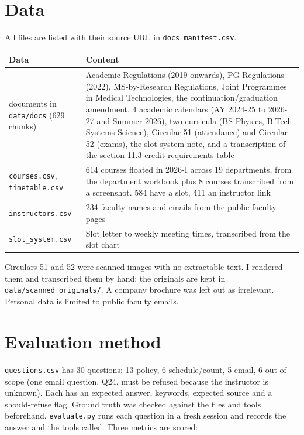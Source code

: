 \documentclass[10pt,a4paper]{article}
\newcommand{\code}[1]{\texttt{\small #1}}
\begin{document}
\section{Data}

All files are listed with their source URL in \code{docs\_manifest.csv}.

\begin{center}\small
\begin{tabularx}{\linewidth}{@{}>{\raggedright\arraybackslash}p{3.6cm}X@{}}
\toprule
Data & Content\\
\midrule
15 documents in \code{data/docs} (629 chunks) & Academic Regulations (2019 onwards), PG Regulations (2022), MS-by-Research Regulations, Joint Programmes in Medical Technologies, the continuation/graduation amendment, 4 academic calendars (AY 2024-25 to 2026-27 and Summer 2026), two curricula (BS Physics, B.Tech Systems Science), Circular 51 (attendance) and Circular 52 (exams), the slot system note, and a transcription of the section 11.3 credit-requirements table\\
\code{courses.csv}, \code{timetable.csv} & 614 courses floated in 2026-I across 19 departments, from the department workbook plus 8 courses transcribed from a screenshot. 584 have a slot, 411 an instructor link\\
\code{instructors.csv} & 234 faculty names and emails from the public faculty pages\\
\code{slot\_system.csv} & Slot letter to weekly meeting times, transcribed from the slot chart\\
\bottomrule
\end{tabularx}
\end{center}

Circulars 51 and 52 were scanned images with no extractable text. I rendered them and transcribed them by hand; the originals are kept in \code{data/scanned\_originals/}. A company brochure was left out as irrelevant. Personal data is limited to public faculty emails.

\section{Evaluation method}

\code{questions.csv} has 30 questions: 13 policy, 6 schedule/count, 5 email, 6 out-of-scope (one email question, Q24, must be refused because the instructor is unknown). Each has an expected answer, keywords, expected source and a should-refuse flag. Ground truth was checked against the files and tools beforehand. \code{evaluate.py} runs each question in a fresh session and records the answer and the tools called. Three metrics are scored:
\end{document}
